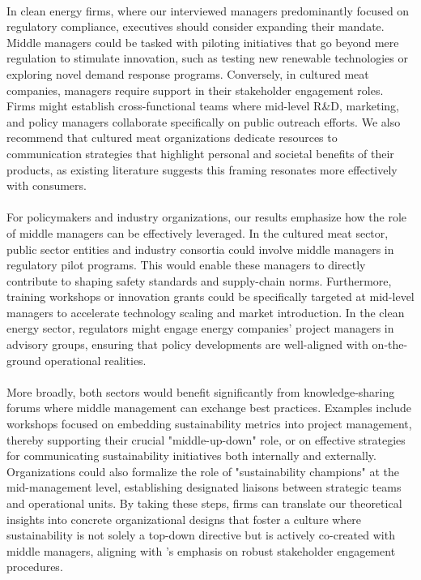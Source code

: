 	\paragraph*{} In clean energy firms, where our interviewed managers predominantly focused on regulatory compliance, executives should consider expanding their mandate. Middle managers could be tasked with piloting initiatives that go beyond mere regulation to stimulate innovation, such as testing new renewable technologies or exploring novel demand response programs. Conversely, in cultured meat companies, managers require support in their stakeholder engagement roles. Firms might establish cross-functional teams where mid-level R\&D, marketing, and policy managers collaborate specifically on public outreach efforts. We also recommend that cultured meat organizations dedicate resources to communication strategies that highlight personal and societal benefits of their products, as existing literature suggests this framing resonates more effectively with consumers.
	
	\paragraph*{} For policymakers and industry organizations, our results emphasize how the role of middle managers can be effectively leveraged. In the cultured meat sector, public sector entities and industry consortia could involve middle managers in regulatory pilot programs. This would enable these managers to directly contribute to shaping safety standards and supply-chain norms. Furthermore, training workshops or innovation grants could be specifically targeted at mid-level managers to accelerate technology scaling and market introduction. In the clean energy sector, regulators might engage energy companies' project managers in advisory groups, ensuring that policy developments are well-aligned with on-the-ground operational realities.
	
	\paragraph*{} More broadly, both sectors would benefit significantly from knowledge-sharing forums where middle management can exchange best practices. Examples include workshops focused on embedding sustainability metrics into project management, thereby supporting their crucial "middle-up-down" role, or on effective strategies for communicating sustainability initiatives both internally and externally. Organizations could also formalize the role of "sustainability champions" at the mid-management level, establishing designated liaisons between strategic teams and operational units. By taking these steps, firms can translate our theoretical insights into concrete organizational designs that foster a culture where sustainability is not solely a top-down directive but is actively co-created with middle managers, aligning with \citeauthor{Eccles2014}'s emphasis on robust stakeholder engagement procedures.
	
